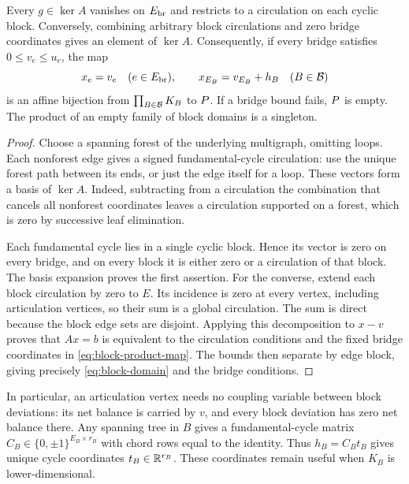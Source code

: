 \begin{lemma}\label{lem:block-factorization}
Every $g\in\ker A$ vanishes on $E_{\rm br}$ and restricts to a circulation
on each cyclic block. Conversely, combining arbitrary block circulations
and zero bridge coordinates gives an element of $\ker A$. Consequently,
if every bridge satisfies $0\le v_e\le u_e$, the map
\begin{equation}\label{eq:block-product-map}
 x_e=v_e\quad(e\in E_{\rm br}),\qquad
 x_{E_B}=v_{E_B}+h_B\quad(B\in\mathcal B)
\end{equation}
is an affine bijection from $\prod_{B\in\mathcal B}K_B$ to $P$.
If a bridge bound fails, $P$ is empty. The product of an empty family
of block domains is a singleton.
\end{lemma}
\begin{proof}
Choose a spanning forest of the underlying multigraph, omitting loops. Each
nonforest edge gives a signed fundamental-cycle circulation: use the unique
forest path between its ends, or just the edge itself for a loop. These
vectors form a basis of $\ker A$. Indeed, subtracting from a circulation
the combination that cancels all nonforest coordinates leaves a circulation
supported on a forest, which is zero by successive leaf elimination.

Each fundamental cycle lies in a single cyclic block. Hence its vector is
zero on every bridge, and on every block it is either zero or a circulation
of that block. The basis expansion proves the first assertion. For the
converse, extend each block circulation by zero to $E$. Its incidence is
zero at every vertex, including articulation vertices, so their sum is a
global circulation. The sum is direct because the block edge sets are
disjoint. Applying this decomposition to $x-v$ proves that $Ax=b$ is
equivalent to the circulation conditions and the fixed bridge coordinates
in \eqref{eq:block-product-map}. The bounds then separate by edge block,
giving precisely \eqref{eq:block-domain} and the bridge conditions.
\end{proof}

In particular, an articulation vertex needs no coupling variable between
block deviations: its net balance is carried by $v$, and every block
deviation has zero net balance there.
Any spanning tree in $B$ gives a fundamental-cycle matrix
$C_B\in\{0,\pm1\}^{E_B\times r_B}$ with chord rows equal to the identity.
Thus $h_B=C_Bt_B$ gives unique cycle coordinates $t_B\in\mathbb R^{r_B}$.
These coordinates remain useful when $K_B$ is lower-dimensional.

